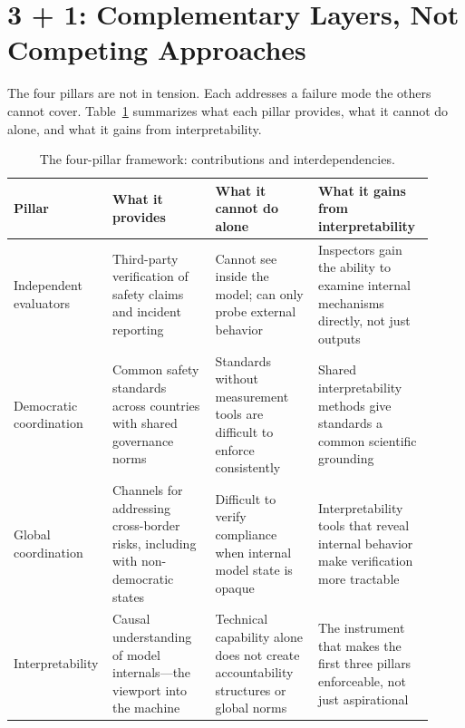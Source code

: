 \documentclass[12pt]{article}
\begin{document}
\section{3 + 1: Complementary Layers, Not Competing Approaches}
\label{sec:together}

The four pillars are not in tension. Each addresses a failure mode the others
cannot cover. Table~\ref{tab:fourpillars} summarizes what each pillar
provides, what it cannot do alone, and what it gains from interpretability.

\begin{table}[h]
\centering
\caption{The four-pillar framework: contributions and interdependencies.}
\label{tab:fourpillars}
\renewcommand{\arraystretch}{1.3}
\begin{tabular}{p{0.17\linewidth}p{0.24\linewidth}p{0.24\linewidth}p{0.27\linewidth}}
\toprule
\textbf{Pillar} & \textbf{What it provides} & \textbf{What it cannot do alone} & \textbf{What it gains from interpretability} \\
\midrule
Independent evaluators &
  Third-party verification of safety claims and incident reporting &
  Cannot see inside the model; can only probe external behavior &
  Inspectors gain the ability to examine internal mechanisms directly, not just outputs \\
Democratic coordination &
  Common safety standards across countries with shared governance norms &
  Standards without measurement tools are difficult to enforce consistently &
  Shared interpretability methods give standards a common scientific grounding \\
Global coordination &
  Channels for addressing cross-border risks, including with non-democratic states &
  Difficult to verify compliance when internal model state is opaque &
  Interpretability tools that reveal internal behavior make verification more tractable \\
Interpretability &
  Causal understanding of model internals---the viewport into the machine &
  Technical capability alone does not create accountability structures or global norms &
  The instrument that makes the first three pillars enforceable, not just aspirational \\
\bottomrule
\end{tabular}
\end{table}
\end{document}
